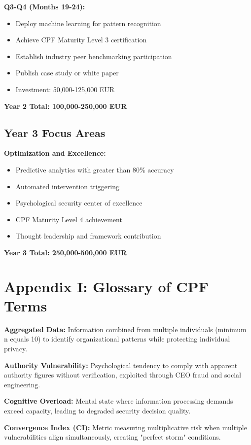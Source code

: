 \documentclass[11pt,a4paper]{article}
\begin{document}
\textbf{Q3-Q4 (Months 19-24):}
\begin{itemize}
\item Deploy machine learning for pattern recognition
\item Achieve CPF Maturity Level 3 certification
\item Establish industry peer benchmarking participation
\item Publish case study or white paper
\item Investment: 50,000-125,000 EUR
\end{itemize}

\textbf{Year 2 Total: 100,000-250,000 EUR}

\subsection{Year 3 Focus Areas}

\textbf{Optimization and Excellence:}
\begin{itemize}
\item Predictive analytics with greater than 80\% accuracy
\item Automated intervention triggering
\item Psychological security center of excellence
\item CPF Maturity Level 4 achievement
\item Thought leadership and framework contribution
\end{itemize}

\textbf{Year 3 Total: 250,000-500,000 EUR}

\section{Appendix I: Glossary of CPF Terms}

\textbf{Aggregated Data:} Information combined from multiple individuals (minimum n equals 10) to identify organizational patterns while protecting individual privacy.

\textbf{Authority Vulnerability:} Psychological tendency to comply with apparent authority figures without verification, exploited through CEO fraud and social engineering.

\textbf{Cognitive Overload:} Mental state where information processing demands exceed capacity, leading to degraded security decision quality.

\textbf{Convergence Index (CI):} Metric measuring multiplicative risk when multiple vulnerabilities align simultaneously, creating "perfect storm" conditions.
\end{document}
